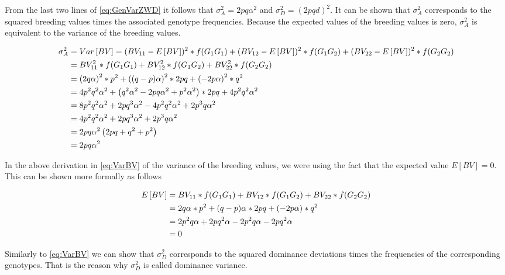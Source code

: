 \documentclass[
]{book}
\theoremstyle{definition}
\theoremstyle{definition}
\theoremstyle{definition}
\theoremstyle{remark}
\begin{document}
From the last two lines of \eqref{eq:GenVarZWD} it follows that \(\sigma_A^2 = 2pq\alpha^2\) and \(\sigma_D^2 = \left(2pqd \right)^2\). It can be shown that \(\sigma_A^2\) corresponds to the squared breeding values times the associated genotype frequencies. Because the expected values of the breeding values is zero, \(\sigma_A^2\) is equivalent to the variance of the breeding values.

\begin{align}
\sigma_A^2 &= Var\left[ BV \right] = (BV_{11} - E\left[ BV \right])^2 * f(G_1G_1) 
              + (BV_{12} - E\left[ BV \right])^2 * f(G_1G_2) 
              + (BV_{22} - E\left[ BV \right])^2 * f(G_2G_2) \notag \\
           &= BV_{11}^2 * f(G_1G_1) + BV_{12}^2 * f(G_1G_2) + BV_{22}^2 * f(G_2G_2) \notag \\
           &= \left(2q \alpha \right)^2 * p^2 +  \left((q-p) \alpha \right)^2 * 2pq + \left(-2p \alpha \right)^2 * q^2 \notag \\
           &= 4p^2 q^2 \alpha^2 + \left(q^2 \alpha^2 -2pq\alpha^2 + p^2 \alpha^2 \right) * 2pq + 4p^2q^2\alpha^2 \notag \\
           &= 8p^2 q^2 \alpha^2 + 2pq^3\alpha^2 -4p^2q^2\alpha^2 + 2p^3q\alpha^2 \notag \\
           &= 4p^2 q^2 \alpha^2 + 2pq^3\alpha^2  + 2p^3q\alpha^2 \notag \\
           &= 2pq\alpha^2 \left(2pq + q^2 + p^2 \right) \notag \\
           &= 2pq\alpha^2
\label{eq:VarBV}
\end{align}

In the above derivation in \eqref{eq:VarBV} of the variance of the breeding values, we were using the fact that the expected value \(E\left[ BV \right]=0\). This can be shown more formally as follows

\begin{align}
E\left[ BV \right]  &=  BV_{11} * f(G_1G_1) + BV_{12} * f(G_1G_2)  + BV_{22} * f(G_2G_2) \notag \\
                    &=  2q \alpha * p^2 + (q-p) \alpha * 2pq + (-2p \alpha) * q^2 \notag \\
                    &=  2p^2q \alpha + 2pq^2 \alpha - 2p^2q\alpha - 2pq^2\alpha \notag \\
                    &=  0
\label{eq:ExpectedValueBV}
\end{align}

Similarly to \eqref{eq:VarBV} we can show that \(\sigma_D^2\) corresponds to the squared dominance deviations times the frequencies of the corresponding genotypes. That is the reason why \(\sigma_D^2\) is called dominance variance.
\end{document}
